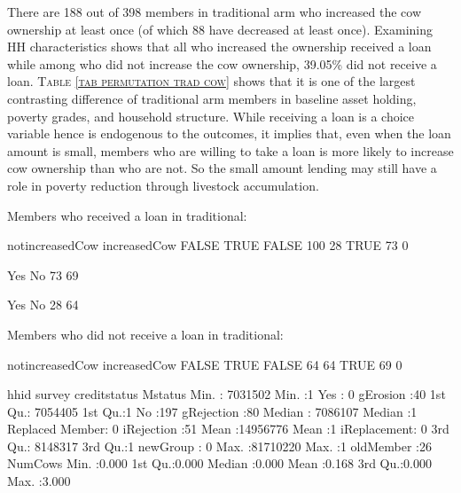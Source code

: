 There are 188 out of 398 members in \textsf{traditional} arm who increased the cow ownership at least once (of which 88 have decreased at least once). Examining HH characteristics shows that all who increased the ownership received a loan while among who did not increase the cow ownership, 39.05\% did not receive a loan. \textsc{\normalsize Table \ref{tab permutation trad cow}} shows that it is one of the largest contrasting difference of \textsf{traditional} arm members in baseline asset holding, poverty grades, and household structure. While receiving a loan is a choice variable hence is endogenous to the outcomes, it implies that, even when the loan amount is small, members who are willing to take a loan is more likely to increase cow ownership than who are not. So the small amount lending may still have a role in poverty reduction through livestock accumulation.


Members who received a loan in \textsf{traditional}:
\begin{Schunk}
\begin{Soutput}
            notincreasedCow
increasedCow FALSE TRUE
       FALSE   100   28
       TRUE     73    0
\end{Soutput}
\begin{Soutput}

Yes  No 
 73  69 
\end{Soutput}
\begin{Soutput}

Yes  No 
 28  64 
\end{Soutput}
\end{Schunk}
Members who did not receive a loan in \textsf{traditional}:
\begin{Schunk}
\begin{Soutput}
            notincreasedCow
increasedCow FALSE TRUE
       FALSE    64   64
       TRUE     69    0
\end{Soutput}
\begin{Soutput}
      hhid              survey           creditstatus         Mstatus  
 Min.   : 7031502   Min.   :1   Yes            :  0   gErosion    :40  
 1st Qu.: 7054405   1st Qu.:1   No             :197   gRejection  :80  
 Median : 7086107   Median :1   Replaced Member:  0   iRejection  :51  
 Mean   :14956776   Mean   :1                         iReplacement: 0  
 3rd Qu.: 8148317   3rd Qu.:1                         newGroup    : 0  
 Max.   :81710220   Max.   :1                         oldMember   :26  
    NumCows     
 Min.   :0.000  
 1st Qu.:0.000  
 Median :0.000  
 Mean   :0.168  
 3rd Qu.:0.000  
 Max.   :3.000  
\end{Soutput}
\end{Schunk}


